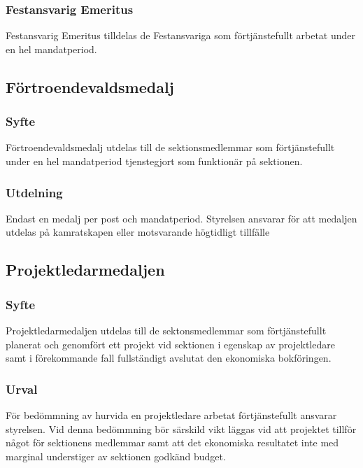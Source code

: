 \documentclass{../resources/dgovdoc}
\begin{document}
\subsubsection{Festansvarig Emeritus}

Festansvarig Emeritus tilldelas de Festansvariga som förtjänstefullt arbetat under en hel mandatperiod.

\subsection{Förtroendevaldsmedalj}

\subsubsection{Syfte}

Förtroendevaldsmedalj utdelas till de sektionsmedlemmar som förtjänstefullt under en hel mandatperiod tjenstegjort som funktionär på sektionen. 

\subsubsection{Utdelning}

Endast en medalj per post och mandatperiod. Styrelsen ansvarar för att medaljen utdelas på kamratskapen eller motsvarande högtidligt tillfälle

\subsection{Projektledarmedaljen}

\subsubsection{Syfte}

Projektledarmedaljen utdelas till de sektonsmedlemmar som förtjänstefullt planerat och genomfört ett projekt vid sektionen i egenskap av projektledare samt i förekommande fall fullständigt avslutat den ekonomiska bokföringen. 

\subsubsection{Urval}

För bedömmning av hurvida en projektledare arbetat förtjänstefullt ansvarar styrelsen. Vid denna bedömmning bör särskild vikt läggas vid att projektet tillför något för sektionens medlemmar samt att det ekonomiska resultatet inte med marginal understiger av sektionen godkänd budget. 
\end{document}
